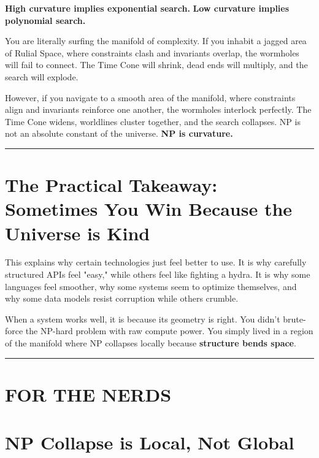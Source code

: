 \textbf{High curvature implies exponential search.}
\textbf{Low curvature implies polynomial search.}

You are literally surfing the manifold of complexity. If you inhabit a jagged area of Rulial Space, where constraints clash and invariants overlap, the wormholes will fail to connect. The Time Cone will shrink, dead ends will multiply, and the search will explode.

However, if you navigate to a smooth area of the manifold, where constraints align and invariants reinforce one another, the wormholes interlock perfectly. The Time Cone widens, worldlines cluster together, and the search collapses. NP is not an absolute constant of the universe. \textbf{NP is curvature.}

\begin{center}\rule{0.5\linewidth}{0.5pt}\end{center}

\section{\texorpdfstring{\textbf{The Practical Takeaway: Sometimes You Win Because the Universe is Kind}}{10.8 --- The Practical Takeaway: Sometimes You Win Because the Universe is Kind}}

This explains why certain technologies just feel better to use. It is why carefully structured APIs feel "easy," while others feel like fighting a hydra. It is why some languages feel smoother, why some systems seem to optimize themselves, and why some data models resist corruption while others crumble.

When a system works well, it is because its geometry is right. You didn't brute-force the NP-hard problem with raw compute power. You simply lived in a region of the manifold where NP collapses locally because \textbf{structure bends space}.

\begin{center}\rule{0.5\linewidth}{0.5pt}\end{center}

\section*{\textbf{FOR THE NERDS\texttrademark}}

\section{\texorpdfstring{\textbf{NP Collapse is Local, Not Global}}{10.9 --- NP Collapse is Local, Not Global}}

